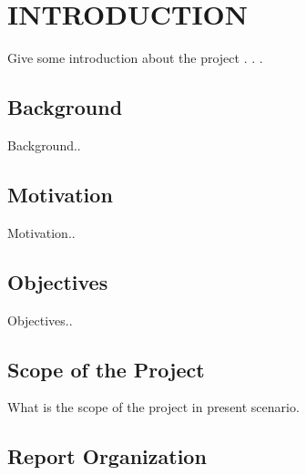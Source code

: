 \documentclass[12pt,a4paper]{report}
\begin{document}



\newpage
{}

\newpage







\tableofcontents
\newpage
\listoffigures
{}
\newpage
\listoftables
{}



\newpage
{}
\chapter {INTRODUCTION}


{ Give some introduction about the project . . .}


\section{Background}
Background..


\section{Motivation}
Motivation..

\section{Objectives}

Objectives..


\section{Scope of the Project}
What is the scope of the project in present scenario.

\section{Report Organization}
\end{document}
